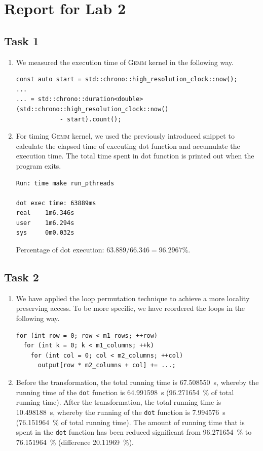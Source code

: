 \documentclass[a4paper, DIV12, headsepline]{scrartcl}
\begin{document}
\section*{Report for Lab 2}
\subsection*{Task 1}
\begin{enumerate}[label=\alph*)]
\item We measured the execution time of \textsc{Gemm} kernel in the following way.
\begin{verbatim}
const auto start = std::chrono::high_resolution_clock::now();
...
... = std::chrono::duration<double>(std::chrono::high_resolution_clock::now()
			- start).count();
\end{verbatim}

\item For timing \textsc{Gemm} kernel, we used the previously introduced snippet to calculate the elapsed time of executing dot function and accumulate the execution time. The total time spent in dot function is printed out when the program exits.
\begin{verbatim}  
Run: time make run_pthreads  

dot exec time: 63889ms
real    1m6.346s
user    1m6.294s
sys     0m0.032s
\end{verbatim}
Percentage of dot execution: $63.889 / 66.346 = 96.2967\%$.
\end{enumerate}

\subsection*{Task 2}
\begin{enumerate}[label=\alph*)]
\item We have applied the loop permutation technique to achieve a more locality preserving access. To be more specific, we have reordered the loops in the following way.
\begin{verbatim}
for (int row = 0; row < m1_rows; ++row)
  for (int k = 0; k < m1_columns; ++k)
    for (int col = 0; col < m2_columns; ++col)
      output[row * m2_columns + col] += ...;
\end{verbatim}

\item Before the transformation, the total running time is \SI{67.508550}{s}, whereby the running time of the \texttt{dot} function is \SI{64.991598}{s} (\SI{96.271654}{\%} of total running time). After the transformation, the total running time is \SI{10.498188}{s}, whereby the running of the \texttt{dot} function is \SI{7.994576}{s} (\SI{76.151964}{\%} of total running time). The amount of running time that is spent in the \texttt{dot} function has been reduced significant from \SI{96.271654}{\%} to \SI{76.151964}{\%} (difference \SI{20.11969}{\%}).
\end{enumerate}
\end{document}
